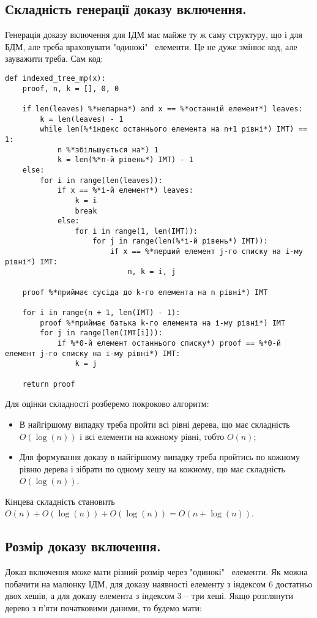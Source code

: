 \documentclass[a4paper, 12pt]{article}
\begin{document}
\subsection{Складність генерації доказу включення.}
\par Генерація доказу включення для ІДМ має майже ту ж саму структуру, що і для БДМ, але треба враховувати "одинокі" \, елементи. Це не дуже змінює код, але зауважити треба. Сам код:

\begin{lstlisting}
def indexed_tree_mp(x):
    proof, n, k = [], 0, 0
    
    if len(leaves) %*непарна*) and x == %*останній елемент*) leaves:
        k = len(leaves) - 1
        while len(%*індекс останнього елемента на n+1 рівні*) IMT) == 1:
            n %*збільшується на*) 1
            k = len(%*n-й рівень*) IMT) - 1
    else:
        for i in range(len(leaves)):
            if x == %*і-й елемент*) leaves:
                k = i
                break
            else:
                for i in range(1, len(IMT)):
                    for j in range(len(%*і-й рівень*) IMT)):
                        if x == %*перший елемент j-го списку на i-му рівні*) IMT:
                            n, k = i, j
    
    proof %*приймає сусіда до k-го елемента на n рівні*) IMT

    for i in range(n + 1, len(IMT) - 1):
        proof %*приймає батька k-го елемента на і-му рівні*) IMT
        for j in range(len(IMT[i])):
            if %*0-й елемент останнього списку*) proof == %*0-й елемент j-го списку на і-му рівні*) IMT:
                k = j

    return proof
\end{lstlisting}

\par Для оцінки складності розберемо покроково алгоритм:
\begin{itemize}
	\item В найгіршому випадку треба пройти всі рівні дерева, що має складність $O(\log(n))$ і всі елементи на кожному рівні, тобто $O(n)$;
	\item Для формування доказу в найгіршому випадку треба пройтись по кожному рівню дерева і зібрати по одному хешу на кожному, що має складність $O(\log(n))$.
\end{itemize}
\par Кінцева складність становить $O(n) + O(\log(n)) + O(\log(n)) = O(n + \log(n))$.

\subsection{Розмір доказу включення.}
\par Доказ включення може мати різний розмір через "одинокі" \, елементи. Як можна побачити на малюнку ІДМ, для доказу наявності елементу з індексом $6$ достатньо двох хешів, а для доказу елемента з індексом $3$ -- три хеші. Якщо розглянути дерево з п'яти початковими даними, то будемо мати:
\end{document}
